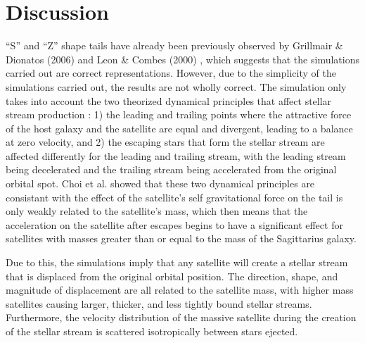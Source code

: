 \documentclass{article}
\begin{document}
\section{Discussion}
``S'' and ``Z'' shape tails have already been previously observed by Grillmair \& Dionatos (2006) \cite{grillmairDionatos} and Leon \& Combes (2000) \cite{leonCombes}, which suggests that the simulations carried out are correct representations. However, due to the simplicity of the simulations carried out, the results are not wholly correct. The simulation only takes into account the two theorized dynamical principles that affect stellar stream production \cite{ringsAndPseudoRings}: 1) the leading and trailing points where the attractive force of the host galaxy and the satellite are equal and divergent, leading to a balance at zero velocity, and 2) the escaping stars that form the stellar stream are affected differently for the leading and trailing stream, with the leading stream being decelerated and the trailing stream being accelerated from the original orbital spot. Choi et al. \cite{dymanicsOfTidalTails} showed that these two dynamical principles are consistant with the effect of the satellite's self gravitational force on the tail is only weakly related to the satellite's mass, which then means that the acceleration on the satellite after escapes begins to have a significant effect for satellites with masses greater than or equal to the mass of the Sagittarius galaxy. 

Due to this, the simulations imply that any satellite will create a stellar stream that is displaced from the original orbital position. The direction, shape, and magnitude of displacement are all related to the satellite mass, with higher mass satellites causing larger, thicker, and less tightly bound stellar streams. Furthermore, the velocity distribution of the massive satellite during the creation of the stellar stream is scattered isotropically between stars ejected. 
\end{document}
